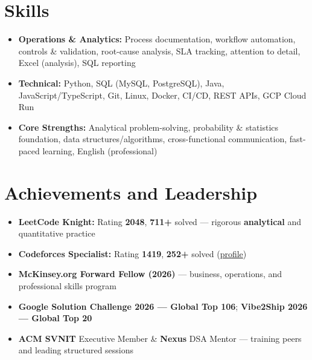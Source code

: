 \documentclass[a4paper,10pt]{article}
\begin{document}
\section{Skills}
\small
\begin{itemize}[label={}]
  \item \textbf{Operations \& Analytics:} Process documentation, workflow automation, controls \& validation, root-cause analysis, SLA tracking, attention to detail, Excel (analysis), SQL reporting
  \item \textbf{Technical:} Python, SQL (MySQL, PostgreSQL), Java, JavaScript/TypeScript, Git, Linux, Docker, CI/CD, REST APIs, GCP Cloud Run
  \item \textbf{Core Strengths:} Analytical problem-solving, probability \& statistics foundation, data structures/algorithms, cross-functional communication, fast-paced learning, English (professional)
\end{itemize}

\section{Achievements and Leadership}
\small
\begin{itemize}
  \item \textbf{LeetCode Knight:} Rating \textbf{2048}, \textbf{711+} solved --- rigorous \textbf{analytical} and quantitative practice
  \item \textbf{Codeforces Specialist:} Rating \textbf{1419}, \textbf{252+} solved (\href{https://codeforces.com/profile/Oju}{profile})
  \item \textbf{McKinsey.org Forward Fellow (2026)} --- business, operations, and professional skills program
  \item \textbf{Google Solution Challenge 2026 --- Global Top 106}; \textbf{Vibe2Ship 2026 --- Global Top 20}
  \item \textbf{ACM SVNIT} Executive Member \& \textbf{Nexus} DSA Mentor --- training peers and leading structured sessions
\end{itemize}
\end{document}
